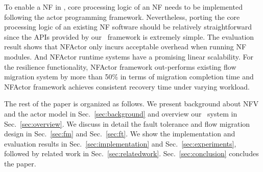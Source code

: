 To enable a NF in \nfactor, core processing logic of an NF needs to be implemented following the actor programming framework. Nevertheless, porting the core
processing logic of an existing NF software should be relatively straightforward since the APIs provided by our \nfactor~framework is extremely simple. The evaluation result shows that NFActor only incurs acceptable overhead when running NF modules. And NFActor runtime systems have a promising linear scalability. For the resilience functionality, NFActor framework out-performs existing flow migration system by more than 50\% in terms of migration completion time and NFActor framework achieves consistent recovery time under varying workload. %



The rest of the paper is organized as follows. We present background about NFV and the actor model in Sec.~\ref{sec:background} and overview our \nfactor~system in Sec.~\ref{sec:overview}. We discuss in detail the fault tolerance and flow migration design in Sec.~\ref{sec:fm} and Sec.~\ref{sec:ft}. We show the implementation and evaluation results in Sec.~\ref{sec:implementation} and Sec.~\ref{sec:experiments}, followed by related work in Sec.~\ref{sec:relatedwork}. Sec.~\ref{sec:conclusion} concludes the paper.
